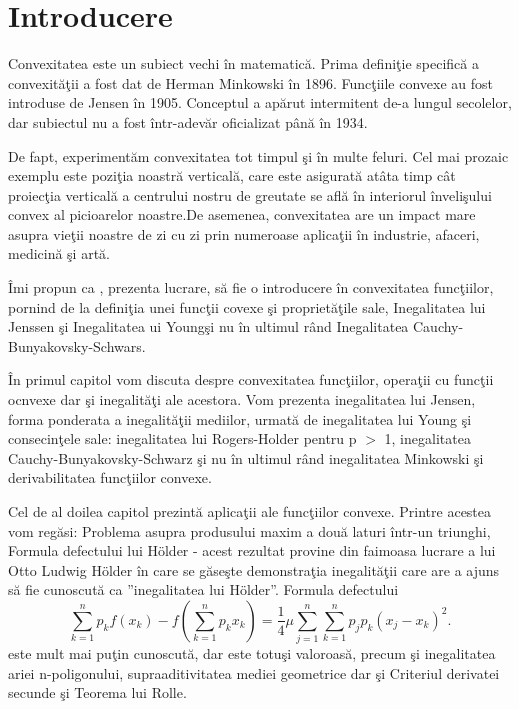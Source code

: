 \documentclass[a4paper,12pt,oneside]{report}
\begin{document}
\chapter*{Introducere}


Convexitatea este un subiect  vechi \^{i}n matematic\u{a}. Prima defini\c{t}ie specific\u{a} a convexit\u{a}\c{t}ii
a fost dat de Herman Minkowski \^{i}n 1896. Func\c{t}iile convexe au fost introduse de Jensen
\^{i}n 1905. Conceptul a ap\u{a}rut intermitent de-a lungul secolelor, dar subiectul
nu a fost \^{i}ntr-adev\u{a}r oficializat p\^{a}n\u{a} \^{i}n 1934.

De fapt, experiment\u{a}m convexitatea tot timpul \c{s}i \^{i}n multe feluri. Cel mai prozaic exemplu este pozi\c{t}ia noastr\u{a} vertical\u{a}, care este asigurat\u{a} at\^{a}ta timp c\^{a}t proiec\c{t}ia vertical\u{a} a centrului nostru de greutate se afl\u{a} \^{i}n interiorul \^{i}nveli\c{s}ului convex al picioarelor noastre.De asemenea, convexitatea are un impact mare asupra vie\c{t}ii noastre de zi cu zi prin numeroase aplica\c{t}ii \^{i}n industrie, afaceri, medicin\u{a} \c{s}i art\u{a}.

\^{I}mi propun ca , prezenta lucrare, s\u{a} fie o introducere \^{i}n convexitatea func\c{t}iilor, pornind de la defini\c{t}ia unei func\c{t}ii covexe \c{s}i propriet\u{a}\c{t}ile sale,  Inegalitatea lui Jenssen \c{s}i Inegalitatea ui Young\c{s}i nu \^{i}n ultimul r\^{a}nd Inegalitatea Cauchy-Bunyakovsky-Schwars.

\^{I}n primul capitol vom discuta despre convexitatea func\c{t}iilor, opera\c{t}ii cu func\c{t}ii ocnvexe dar \c{s}i inegalit\u{a}\c{t}i ale acestora. Vom prezenta inegalitatea lui Jensen, forma ponderata a inegalit\u{a}\c{t}ii mediilor, urmat\u{a} de inegalitatea lui Young \c{s}i consecin\c{t}ele sale: inegalitatea lui Rogers-Holder pentru p \(>\) 1, inegalitatea Cauchy-Bunyakovsky-Schwarz \c{s}i nu \^{i}n ultimul r\^{a}nd inegalitatea Minkowski \c{s}i derivabilitatea func\c{t}iilor convexe.

Cel de al doilea capitol prezint\u{a} aplica\c{t}ii ale func\c{t}iilor convexe. Printre acestea vom reg\u{a}si: Problema asupra produsului maxim a dou\u{a} laturi \^{i}ntr-un triunghi, Formula defectului lui Hölder - acest rezultat provine din faimoasa lucrare a lui Otto Ludwig Hölder \^{i}n care se g\u{a}seşte demonstra\c{t}ia inegalit\u{a}ţii care are a ajuns s\u{a} fie cunoscut\u{a}  ca ”inegalitatea lui Hölder”. Formula defectului 
\begin{displaymath}
      \sum_{k = 1}^{n}p_{k}f\left ( x_{k} \right ) - f\left ( \sum_{k = 1}^{n} p_{k}x_{k}\right ) = \frac{1}{4}\mu \sum_{j = 1}^{n}\sum_{k = 1}^{n}p_{j}p_{k}\left ( x_{j} - x_{k} \right )^{2}.
\end{displaymath}
este mult mai pu\c{t}in cunoscut\u{a}, dar este totu\c{s}i valoroas\u{a}, precum \c{s}i  inegalitatea ariei n-poligonului, supraaditivitatea mediei geometrice dar \c{s}i Criteriul derivatei secunde \c{s}i Teorema lui Rolle.
\end{document}
